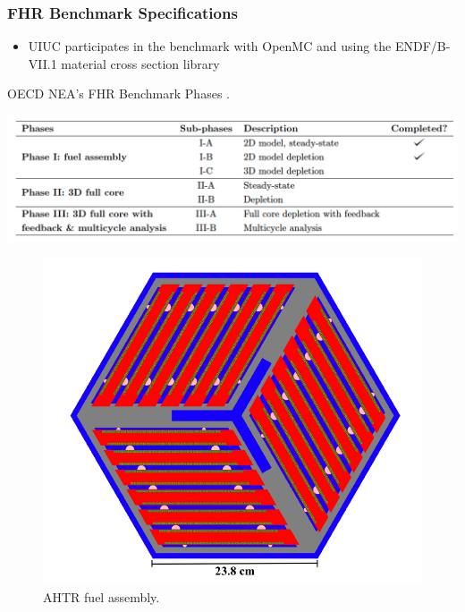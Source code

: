 \begin{frame}
    \frametitle{FHR Benchmark Specifications}
    \begin{itemize}
        \item UIUC participates in the benchmark with OpenMC and using the ENDF/B-VII.1 material 
        cross section library
    \end{itemize}
    \vspace{-0.2cm}
    \begin{table}
        \caption{OECD NEA's FHR Benchmark Phases 
        \cite{petrovic_benchmark_2021}.}
        \vspace{-0.25cm}
        \includegraphics[width=0.8\linewidth]{figures/benchmark-phases.png} 
    \end{table}
    \vspace{-0.3cm}
    \begin{figure}[]
        \includegraphics[width=0.3\linewidth]{figures/ahtr-assembly.png} 
        \vspace{-0.2cm}
        \caption{AHTR fuel assembly.}
    \end{figure}
\end{frame}

